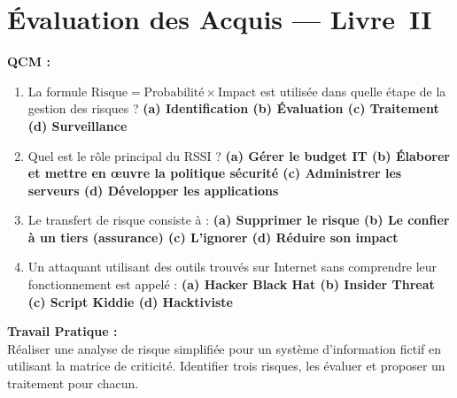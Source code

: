 \section{Évaluation des Acquis --- Livre~II}

\begin{boxexo}
\textbf{QCM :}
\begin{enumerate}
    \item La formule $\text{Risque} = \text{Probabilité} \times \text{Impact}$ est utilisée dans quelle étape de la gestion des risques ? \textbf{(a) Identification \quad (b) Évaluation \quad (c) Traitement \quad (d) Surveillance}
    \item Quel est le rôle principal du RSSI ? \textbf{(a) Gérer le budget IT \quad (b) Élaborer et mettre en œuvre la politique sécurité \quad (c) Administrer les serveurs \quad (d) Développer les applications}
    \item Le transfert de risque consiste à : \textbf{(a) Supprimer le risque \quad (b) Le confier à un tiers (assurance) \quad (c) L'ignorer \quad (d) Réduire son impact}
    \item Un attaquant utilisant des outils trouvés sur Internet sans comprendre leur fonctionnement est appelé : \textbf{(a) Hacker Black Hat \quad (b) Insider Threat \quad (c) Script Kiddie \quad (d) Hacktiviste}
\end{enumerate}

\textbf{Travail Pratique :}\\
Réaliser une analyse de risque simplifiée pour un système d'information fictif en utilisant la matrice de criticité. Identifier trois risques, les évaluer et proposer un traitement pour chacun.
\end{boxexo}
